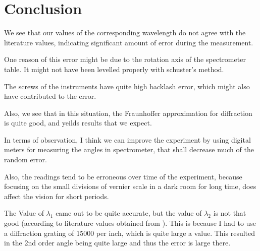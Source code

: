 \section{Conclusion}
	We see that our values of the corresponding wavelength do not agree with the literature values, indicating significant amount of error during the measurement.

	One reason of this error might be due to the rotation axis of the spectrometer table. It might not have been levelled properly with schuster's method.

	The screws of the instruments have quite high backlash error, which might also have contributed to the error.

	Also, we see that in this situation, the Fraunhoffer approximation for diffraction is quite good, and yeilds results that we expect.

	In terms of observation, I think we can improve the experiment by using digital meters for measuring the angles in spectrometer, that shall decrease much of the random error.

	Also, the readings tend to be erroneous over time of the experiment, because focusing on the small divisions of vernier scale in a dark room for long time, does affect the vision for short periods.

	The Value of $\lambda_1$ came out to be quite accurate, but the value of $\lambda_2$ is not that good (according to literature values obtained from \cite{manual}). This is because I had to use a diffraction grating of 15000 per inch, which is quite large a value. This resulted in the 2nd order angle being quite large and thus the error is large there.